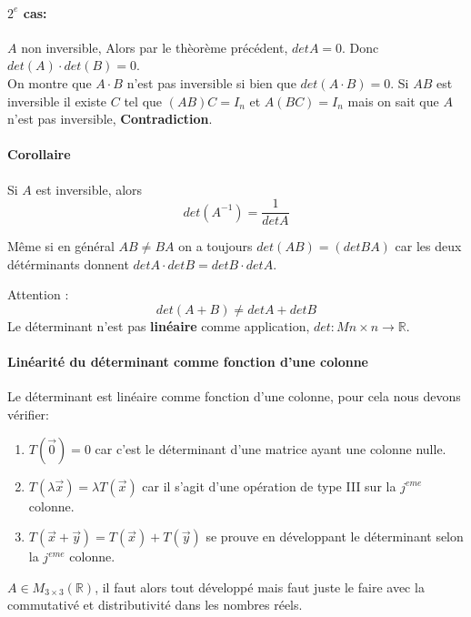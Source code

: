 \documentclass[11pt]{book}
\begin{document}
    \paragraph{$2^{e}$ cas: } $A$ non inversible, Alors par le thèorème précédent, $det A = 0$. Donc $det(A) \cdot det(B) = 0$.\\
    On montre que $A\cdot B $ n'est pas inversible si bien que $det(A\cdot B) = 0$. Si $AB$ est inversible il existe $C$ tel que $(AB)C = I_n$ et $A(BC) = I_n$ mais on sait que $A$ n'est pas inversible, \textbf{Contradiction}.
    \\
    \paragraph{Corollaire} Si $A$ est inversible, alors \[det(A^{-1}) = \frac{1}{det A}\]
    \begin{framedremark}
        Même si en général $AB \neq BA$ on a toujours $det(AB) = (detBA)$ car les deux détérminants donnent $det A \cdot det B = det B \cdot det A$.
    \end{framedremark}
    \begin{framedremark}
        
    
        Attention : \[ det(A + B) \neq det A + det B\]
        Le déterminant n'est pas \textbf{linéaire} comme application, $det : M{n\times n} \to \mathbb{R}$.
    
    \end{framedremark}


    \paragraph{Linéarité du déterminant comme fonction \textbf{d'une colonne}}
    Le déterminant est linéaire comme fonction d'une colonne, pour cela nous devons vérifier:
    \begin{enumerate}
        \item $T(\vec{0}) = 0$ car c'est le déterminant d'une matrice ayant une colonne nulle.
        \item $T(\lambda\vec{x}) = \lambda T(\vec{x})$ car il s'agit d'une opération de type III sur la $j^{eme}$ colonne.
        \item $T(\vec{x}+ \vec{y}) = T(\vec{x}) + T(\vec{y})$ se prouve en développant le déterminant selon la $j^{eme}$ colonne.

    \end{enumerate}


    $A  \in M_{3\times3}(\mathbb{R})$, il faut alors tout développé mais faut juste le faire avec la commutativé et distributivité dans les nombres réels.
\end{document}
